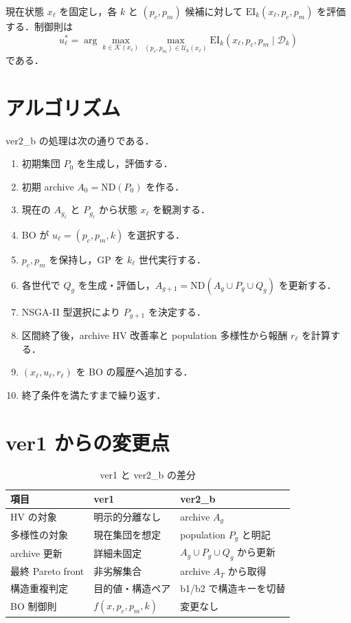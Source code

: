 \documentclass[a4paper,11pt]{ltjsarticle}
\newcommand{\EI}{\mathrm{EI}}
\newcommand{\ND}{\mathrm{ND}}
\begin{document}
現在状態 \(x_\ell\) を固定し，各 \(k\) と \((p_c,p_m)\) 候補に対して
\(\EI_k(x_\ell,p_c,p_m)\) を評価する．制御則は
\begin{equation}
u_\ell^\ast
=
\arg\max_{k\in\mathcal{K}(x_\ell)}
\max_{(p_c,p_m)\in\mathcal{U}_k(x_\ell)}
\EI_k(x_\ell,p_c,p_m\mid\mathcal{D}_k)
\end{equation}
である．

\section{アルゴリズム}

ver2\_b の処理は次の通りである．

\begin{enumerate}[leftmargin=3em]
  \item 初期集団 \(P_0\) を生成し，評価する．
  \item 初期 archive \(A_0=\ND(P_0)\) を作る．
  \item 現在の \(A_{g_\ell}\) と \(P_{g_\ell}\) から状態 \(x_\ell\) を観測する．
  \item BO が \(u_\ell=(p_c,p_m,k)\) を選択する．
  \item \(p_c,p_m\) を保持し，GP を \(k_\ell\) 世代実行する．
  \item 各世代で \(Q_g\) を生成・評価し，\(A_{g+1}=\ND(A_g\cup P_g\cup Q_g)\) を更新する．
  \item NSGA-II 型選択により \(P_{g+1}\) を決定する．
  \item 区間終了後，archive HV 改善率と population 多様性から報酬 \(r_\ell\) を計算する．
  \item \((x_\ell,u_\ell,r_\ell)\) を BO の履歴へ追加する．
  \item 終了条件を満たすまで繰り返す．
\end{enumerate}

\section{ver1 からの変更点}

\begin{table}[htbp]
\centering
\caption{ver1 と ver2\_b の差分}
\begin{tabular}{lll}
\toprule
項目 & ver1 & ver2\_b \\
\midrule
HV の対象 & 明示的分離なし & archive \(A_g\) \\
多様性の対象 & 現在集団を想定 & population \(P_g\) と明記 \\
archive 更新 & 詳細未固定 & \(A_g\cup P_g\cup Q_g\) から更新 \\
最終 Pareto front & 非劣解集合 & archive \(A_T\) から取得 \\
構造重複判定 & 目的値・構造ペア & b1/b2 で構造キーを切替 \\
BO 制御則 & \(f(x,p_c,p_m,k)\) & 変更なし \\
\bottomrule
\end{tabular}
\end{table}
\end{document}
